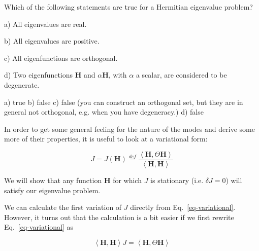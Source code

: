 \pagebreak

\begin{exer}
  
  Which of the following statements are true for a Hermitian eigenvalue problem?

  a) All eigenvalues are real.

  b) All eigenvalues are positive.

  c) All eigenfunctions are orthogonal.

  d) Two eigenfunctions $\mathbf H$ and $\alpha\mathbf H$, with $\alpha$ a scalar, are considered to be degenerate.
  
  \begin{sol}
    a) true b) false c) false (you can construct an orthogonal set, but they are in general not orthogonal, e.g. when you have degeneracy.) d) false
  \end{sol}

\end{exer}

\pagebreak

\label{sec-sym-var}


In order to get some general feeling for the nature of the modes and derive some more of their properties, it is useful to look at a variational form:

\begin{equation}
J = J({\mathbf H}) \stackrel{def}{=} \frac{\left\langle {\mathbf H} , \Theta {\mathbf H}\right\rangle}{\left\langle {\mathbf H} , {\mathbf H}\right\rangle} \label{eq-variational}
\end{equation}  

We will show that any function ${\mathbf H}$ for which $J$ is stationary (i.e. $\delta J=0$) will satisfy our eigenvalue problem.

We can calculate the first variation of $J$ directly from Eq.~\ref{eq-variational}. However, it turns out that the calculation is a bit easier if we first rewrite Eq.~\ref{eq-variational} as

\begin{equation}
\left\langle {\mathbf H},{\mathbf H} \right\rangle J = \left\langle {\mathbf H},\Theta {\mathbf H} \right\rangle \label{eq-variational-1}
\end{equation} 

